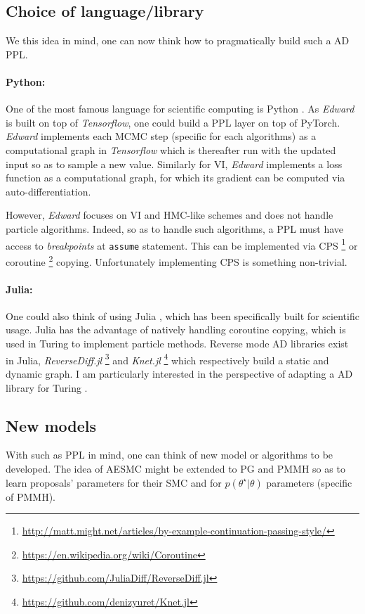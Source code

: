 \subsection{Choice of language/library}
We this idea in mind, one can now think how to pragmatically build such a \gls{AD} \gls{PPL}.

\paragraph{Python:}
One of the most famous language for scientific computing is Python \cite{Rossum:1995:PRM:869369}.
As \emph{Edward} \cite{Edward} is built on top of \emph{Tensorflow}, one could build a \gls{PPL} layer on top of PyTorch. \emph{Edward} implements each \gls{MCMC} step (specific for each algorithms) as a computational graph in \emph{Tensorflow} which is thereafter run with the updated input so as to sample a new value. Similarly for \gls{VI}, \emph{Edward} implements a loss function as a computational graph, for which its gradient can be computed via auto-differentiation.

However, \emph{Edward} focuses on \gls{VI} and \gls{HMC}-like schemes and does not handle particle algorithms.
Indeed, so as to handle such algorithms, a \gls{PPL} must have access to \textit{breakpoints} at \texttt{assume} statement. This can be implemented via \gls{CPS} \footnote{\url{http://matt.might.net/articles/by-example-continuation-passing-style/}} or coroutine \footnote{\url{https://en.wikipedia.org/wiki/Coroutine}} copying. Unfortunately implementing \gls{CPS} is something non-trivial.

\paragraph{Julia:}
One could also think of using Julia \cite{Bezanson:2017gd}, which has been specifically built for scientific usage. Julia has the advantage of natively handling coroutine copying, which is used in Turing \cite{Turing} to implement particle methods.
Reverse mode \gls{AD} libraries exist in Julia, \emph{ReverseDiff.jl} \footnote{\url{https://github.com/JuliaDiff/ReverseDiff.jl}} and \emph{Knet.jl} \footnote{\url{https://github.com/denizyuret/Knet.jl}} which respectively build a static and dynamic graph.
I am particularly interested in the perspective of adapting a \gls{AD} library for Turing \cite{Turing}.

\subsection{New models}
With such as \gls{PPL} in mind, one can think of new model or algorithms to be developed.
The idea of AESMC \cite{Le:2017wm} might be extended to \gls{PG} and \gls{PMMH} so as to learn proposals' parameters for their \gls{SMC} and for $p(\theta^\star|\theta)$ parameters (specific of \gls{PMMH}).

